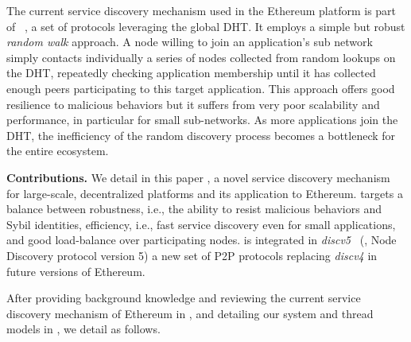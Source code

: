 The current service discovery mechanism used in the Ethereum platform is part of \discv~\cite{discv4}, a set of protocols leveraging the global DHT.
It employs a simple but robust \emph{random walk} approach.
A node willing to join an application's sub network simply contacts individually a series of nodes collected from random lookups on the DHT, repeatedly checking application membership until it has collected enough peers participating to this target application. %
This approach offers good resilience to malicious behaviors
but it suffers from very poor scalability and performance, in particular for small sub-networks.
As more applications join the DHT, the inefficiency of the random discovery process becomes a bottleneck for the entire ecosystem.  

\smallskip
\noindent
\textbf{Contributions.}
%
We detail in this paper \sysname, a novel service discovery mechanism for large-scale, decentralized platforms and its application to Ethereum.
\sysname targets a balance between robustness, i.e., the ability to resist malicious behaviors and Sybil identities, efficiency, i.e., fast service discovery even for small applications, and good load-balance over participating nodes.
\sysname is integrated in \emph{discv5}~\cite{discv5} (\ie, Node Discovery protocol version 5) a new set of P2P protocols replacing \emph{discv4} in future versions of Ethereum. 

After providing background knowledge and reviewing the current service discovery mechanism of Ethereum in , and detailing our system and thread models in , we detail \sysname as follows.

